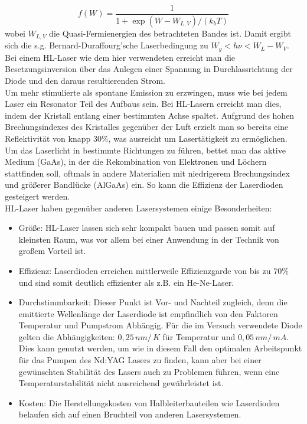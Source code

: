 \documentclass[twoside,colorback,accentcolor=tud4c,11pt]{tudreport}
\begin{document}
\begin{equation}
f(W)=\frac{1}{1+\exp\left(W-W_{L,V}\right)/ (k_{b}T)}
\end{equation}
wobei $W_{L,V}$ die Quasi-Fermienergien des betrachteten Bandes ist. Damit ergibt sich die s.g. Bernard-Duraffourg'sche Laserbedingung zu $W_{g}<h\nu <W_{L}-W_{V}$. Bei einem HL-Laser wie dem hier verwendeten erreicht man die Besetzungsinversion über das Anlegen einer Spannung in Durchlassrichtung der Diode und den daraus resultierenden Strom. \\
Um mehr stimulierte als spontane Emission zu erzwingen, muss wie bei jedem Laser ein Resonator Teil des Aufbaus sein. Bei HL-Lasern erreicht man dies, indem der Kristall entlang einer bestimmten Achse spaltet. Aufgrund des hohen Brechungsindexes des Kristalles gegenüber der Luft erzielt man so bereits eine Reflektivität von knapp 30\%, was ausreicht um Lasertätigkeit zu ermöglichen. Um das Laserlicht in bestimmte Richtungen zu führen, bettet man das aktive Medium (GaAs), in der die Rekombination von Elektronen und Löchern stattfinden soll, oftmals in andere Materialien mit niedrigerem Brechungsindex und größerer Bandlücke (AlGaAs) ein. So kann die Effizienz der Laserdioden gesteigert werden.\\
HL-Laser haben gegenüber anderen Lasersystemen einige Besonderheiten:
\begin{itemize}
\item Größe: HL-Laser lassen sich sehr kompakt bauen und passen somit auf kleinsten Raum, was vor allem bei einer Anwendung in der Technik von großem Vorteil ist.
\item Effizienz: Laserdioden erreichen mittlerweile Effizienzgarde von bis zu $70\%$ und sind somit deutlich effizienter als z.B. ein He-Ne-Laser.
\item Durchstimmbarkeit: Dieser Punkt ist Vor- und Nachteil zugleich, denn die emittierte Wellenlänge der Laserdiode ist empfindlich von den Faktoren Temperatur und Pumpstrom Abhängig. Für die im Versuch verwendete Diode gelten die Abhängigkeiten: $0,25\,\si{nm}/\,\si{K}$ für Temperatur und $0,05\,\si{nm}/\,\si{mA}$. Dies kann genutzt werden, um wie in diesem Fall den optimalen Arbeitspunkt für das Pumpen des Nd:YAG Lasers zu finden, kann aber bei einer gewünschten Stabilität des Lasers auch zu Problemen führen, wenn eine Temperaturstabilität nicht ausreichend gewährleistet ist.
\item Kosten: Die Herstellungskosten von Halbleiterbauteilen wie Laserdioden belaufen sich auf einen Bruchteil von anderen Lasersystemen.
\end{itemize}\cite{anl,laser}
\end{document}
